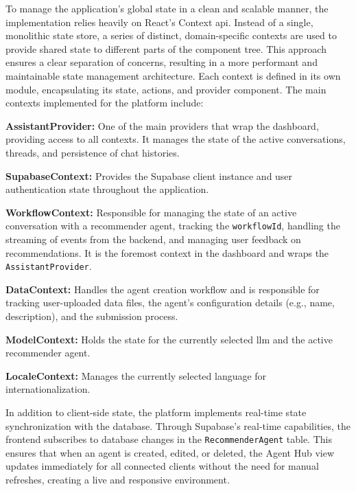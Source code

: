 To manage the application's global state in a clean and scalable manner, the implementation relies heavily on React's Context \acs{api}. Instead of a single, monolithic state store, a series of distinct, domain-specific contexts are used to provide shared state to different parts of the component tree. This approach ensures a clear separation of concerns, resulting in a more performant and maintainable state management architecture. Each context is defined in its own module, encapsulating its state, actions, and provider component. The main contexts implemented for the platform include:

\begin{compactitem}[\textbullet]
    \item \textbf{AssistantProvider:} One of the main providers that wrap the dashboard, providing access to all contexts. It manages the state of the active conversations, threads, and persistence of chat histories.
    \item \textbf{SupabaseContext:} Provides the Supabase client instance and user authentication state throughout the application.
    \item \textbf{WorkflowContext:} Responsible for managing the state of an active conversation with a recommender agent, tracking the \texttt{workflowId}, handling the streaming of events from the backend, and managing user feedback on recommendations. It is the foremost context in the dashboard and wraps the \texttt{AssistantProvider}.
    \item \textbf{DataContext:} Handles the agent creation workflow and is responsible for tracking user-uploaded data files, the agent's configuration details (e.g., name, description), and the submission process.
    \item \textbf{ModelContext:} Holds the state for the currently selected \ac{llm} and the active recommender agent.
    \item \textbf{LocaleContext:} Manages the currently selected language for internationalization.
\end{compactitem}

In addition to client-side state, the platform implements real-time state synchronization with the database. Through Supabase's real-time capabilities, the frontend subscribes to database changes in the \texttt{RecommenderAgent} table. This ensures that when an agent is created, edited, or deleted, the Agent Hub view updates immediately for all connected clients without the need for manual refreshes, creating a live and responsive environment.
